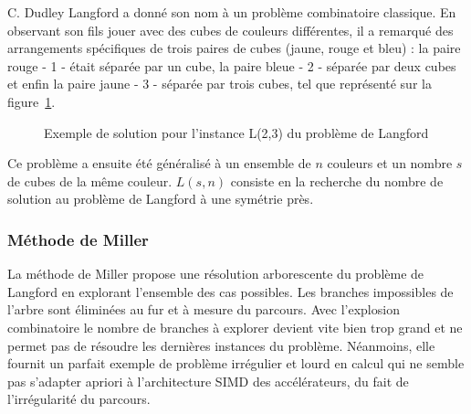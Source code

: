 \documentclass[12pt,a4paper]{report}
\newcommand{\locpath}{.}
\begin{document}
C. Dudley Langford a donné son nom à un problème combinatoire classique\cite{Gard56, Simp83}.  
En observant son fils jouer avec des cubes de couleurs différentes, il a remarqué des arrangements spécifiques de trois paires de cubes (jaune, rouge et bleu) : la paire rouge - 1 - était séparée par un cube, la paire bleue - 2 - séparée par deux cubes et enfin la paire jaune - 3 - séparée par trois cubes, tel que représenté sur la figure~\ref{fig:lang}.\\
%
\begin{figure}   
\begin{center}    
\end{center}
\caption{Exemple de solution pour l'instance L(2,3) du problème de Langford} \label{fig:lang}  
\end{figure}
%
Ce problème a ensuite été généralisé à un ensemble de $n$ couleurs et un nombre $s$ de cubes de la même couleur.   
$L(s,n)$ consiste en la recherche du nombre de solution au problème de Langford à une symétrie près. 

\subsubsection{Méthode de Miller}
La méthode de Miller propose une résolution arborescente du problème de Langford en explorant l'ensemble des cas possibles.
Les branches impossibles de l'arbre sont éliminées au fur et à mesure du parcours.
Avec l'explosion combinatoire le nombre de branches à explorer devient vite bien trop grand et ne permet pas de résoudre les dernières instances du problème. 
Néanmoins, elle fournit un parfait exemple de problème irrégulier et lourd en calcul qui ne semble pas s'adapter apriori à l'architecture SIMD des accélérateurs, du fait de l'irrégularité du parcours. 
\end{document}
